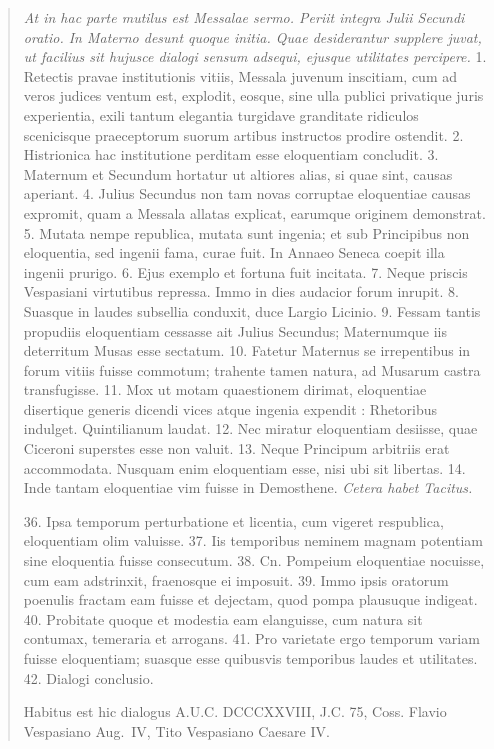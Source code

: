 \begin{quotation}
\textit{At in hac parte mutilus est Messalae sermo. Periit integra Julii Secundi oratio. In Materno desunt quoque initia. Quae desiderantur supplere juvat, ut facilius sit hujusce dialogi sensum adsequi, ejusque utilitates percipere.} 1. Retectis pravae institutionis vitiis, Messala juvenum inscitiam, cum ad veros judices ventum est, explodit, eosque, sine ulla publici privatique juris experientia, exili tantum elegantia turgidave granditate ridiculos scenicisque praeceptorum suorum artibus instructos prodire ostendit. 2. Histrionica hac institutione perditam esse eloquentiam concludit. 3. Maternum et Secundum hortatur ut altiores alias, si quae sint, causas aperiant. 4. Julius Secundus non tam novas corruptae eloquentiae causas expromit, quam a Messala allatas explicat, earumque originem demonstrat. 5. Mutata nempe republica, mutata sunt ingenia; et sub Principibus non eloquentia, sed ingenii fama, curae fuit. In Annaeo Seneca coepit illa ingenii prurigo. 6. Ejus exemplo et fortuna fuit incitata. 7. Neque priscis Vespasiani virtutibus repressa. Immo in dies audacior forum inrupit. 8. Suasque in laudes subsellia conduxit, duce Largio Licinio. 9. Fessam tantis propudiis eloquentiam cessasse ait Julius Secundus; Maternumque iis deterritum Musas esse sectatum. 10. Fatetur Maternus se irrepentibus in forum vitiis fuisse commotum; trahente tamen natura, ad Musarum castra transfugisse. 11. Mox ut motam quaestionem dirimat, eloquentiae disertique generis dicendi vices atque ingenia expendit : Rhetoribus indulget. Quintilianum laudat. 12. Nec miratur eloquentiam desiisse, quae Ciceroni superstes esse non valuit. 13. Neque Principum arbitriis erat accommodata. Nusquam enim eloquentiam esse, nisi ubi sit libertas. 14. Inde tantam eloquentiae vim fuisse in Demosthene. \textit{Cetera habet Tacitus.} 

36. Ipsa temporum perturbatione et licentia, cum vigeret respublica, eloquentiam olim valuisse. 37. Iis temporibus neminem magnam potentiam sine eloquentia fuisse consecutum. 38. Cn. Pompeium eloquentiae nocuisse, cum eam adstrinxit, fraenosque ei imposuit. 39. Immo ipsis oratorum poenulis fractam eam fuisse et dejectam, quod pompa plausuque indigeat. 40. Probitate quoque et modestia eam elanguisse, cum natura sit contumax, temeraria et arrogans. 41. Pro varietate ergo temporum variam fuisse eloquentiam; suasque esse quibusvis temporibus laudes et utilitates. 42. Dialogi conclusio.

\medskip

\noindent Habitus est hic dialogus A.U.C. DCCCXXVIII, J.C. 75, Coss. Flavio Vespasiano Aug.\ IV, Tito Vespasiano Caesare IV. 

\end{quotation}


